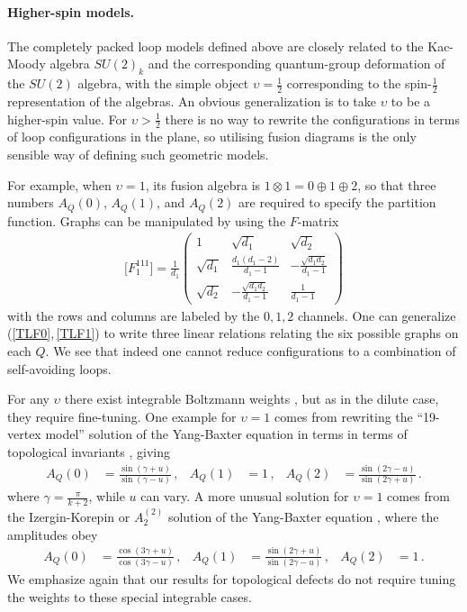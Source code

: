 \paragraph{Higher-spin models.}
The completely packed loop models defined above are closely related to the Kac-Moody algebra $SU(2)_k$ and the corresponding quantum-group deformation of the $SU(2)$ algebra, with the simple object $\upsilon=\tfrac12$ corresponding to the spin-$\tfrac12$ representation of the algebras.
An obvious generalization is to take $\upsilon$ to be a higher-spin value.
For $\upsilon>\tfrac12$ there is no way to rewrite the configurations in terms of loop configurations in the plane, so utilising fusion diagrams is the only sensible way of defining such geometric models. 

For example, when $\upsilon=1$, its fusion algebra is $1\otimes1 = 0\oplus1\oplus2$, so that three numbers $A_Q(0)$, $A_Q(1)$, and $A_Q(2)$ are required to specify the partition function.
Graphs can be manipulated by using the $F$-matrix
\begin{align}
	\big[ F^{111}_{1} \big] = \frac{1}{d_1}
		\begin{pmatrix} 1 &\sqrt{d_1}&\sqrt{d_2}
		\\ \sqrt{d_1}& \frac{d_1(d_1-2)}{d_1-1}&-\frac{\sqrt{d_1d_2}}{d_1-1}
		\\ \sqrt{d_2} & -\frac{\sqrt{d_1d_2}}{d_1-1}&\frac{1}{d_1-1}
		\end{pmatrix}
	\label{Fmat1}
\end{align}
with the rows and columns are labeled by the $0,1,2$ channels.
One can generalize (\ref{TLF0},\,\ref{TLF1}) to write three linear relations relating the six possible graphs on each $Q$.
We see that indeed one cannot reduce configurations to a combination of self-avoiding loops. 

For any $\upsilon$ there exist integrable Boltzmann weights \cite{Kulish:1981}, but as in the dilute case, they require fine-tuning.
One example for $\upsilon=1$ comes from rewriting the ``19-vertex model'' solution of the Yang-Baxter equation \cite{Zamolodchikov1980} in terms in terms of topological invariants \cite{Wadati1989}, giving
\begin{align}
	A_Q(0) &= \frac{\sin(\gamma+u)}{\sin(\gamma-u)} \,,
&	A_Q(1)&= 1 \,,
&	A_Q(2) &= \frac{\sin(2\gamma-u)}{\sin(2\gamma+u)} \,.
\label{spinoneYBE}
\end{align}
where $\gamma = \frac{\pi}{k+2}$, while $u$ can vary. 
A more unusual solution for $\upsilon=1$ comes from the Izergin-Korepin or $A_2^{(2)}$ solution of the Yang-Baxter equation \cite{Izergin:1980,Jimbo:1985}, where the amplitudes obey
\begin{align}
	A_Q(0) &= \frac{\cos(3\gamma+u)}{\cos(3\gamma-u)} \,,
&	A_Q(1) &= \frac{\sin(2\gamma+u)}{\sin(2\gamma-u)} \,,
&	A_Q(2) &= 1 \,.
\label{IKYBE}
\end{align}
We emphasize again that our results for topological defects do not require tuning the weights to these special integrable cases. 

